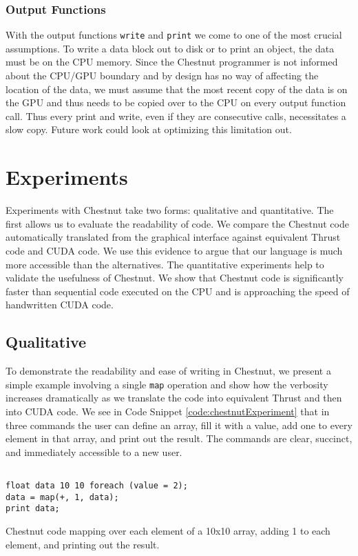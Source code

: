 \documentclass[twocolumn]{article}
\renewcommand{\|}{\origbar} %
\newcommand{\code}[1]{\texttt{#1}}
\begin{document}
\subsubsection{Output Functions}

With the output functions \code{write} and \code{print} we come to one of the most crucial assumptions. To write a data block out to disk or to print an object, the data must be on the CPU memory. Since the Chestnut programmer is not informed about the CPU/GPU boundary and by design has no way of affecting the location of the data, we must assume that the most recent copy of the data is on the GPU and thus needs to be copied over to the CPU on every output function call. Thus every print and write, even if they are consecutive calls, necessitates a slow copy. Future work could look at optimizing this limitation out. 


\section{Experiments}
\label{sec:experiments}

Experiments with Chestnut take two forms: qualitative and quantitative. The first allows us to evaluate the readability of code. We compare the Chestnut code automatically translated from the graphical interface against equivalent Thrust code and CUDA code. We use this evidence to argue that our language is much more accessible than the alternatives. The quantitative experiments help to validate the usefulness of Chestnut. We show that Chestnut code is significantly faster than sequential code executed on the CPU and is approaching the speed of handwritten CUDA code.

\subsection{Qualitative}

To demonstrate the readability and ease of writing in Chestnut, we present a simple example involving a single \code{map} operation and show how the verbosity increases dramatically as we translate the code into equivalent Thrust and then into CUDA code. We see in Code Snippet \ref{code:chestnutExperiment} that in three commands the user can define an array, fill it with a value, add one to every element in that array, and print out the result. The commands are clear, succinct, and immediately accessible to a new user. 

\begin{Code Snippet}
\begin{verbatim}

float data 10 10 foreach (value = 2);
data = map(+, 1, data);
print data;
\end{verbatim}
\caption{Chestnut code mapping over each element of a 10x10 array, adding 1 to each element, and printing out the result.}
\label{code:chestnutExperiment}
\end{Code Snippet}
\end{document}
